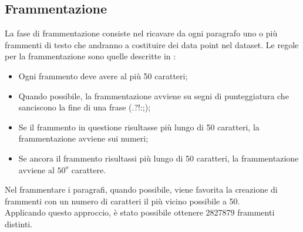 \documentclass[12pt]{article}
\begin{document}
\subsection{Frammentazione} \label{sec:spezzettamento}
La fase di frammentazione consiste nel ricavare da ogni paragrafo uno o più frammenti di testo che andranno a costituire dei data point nel dataset. Le regole per la frammentazione sono quelle descritte in  \cite{nematus}:
\begin{itemize}
\item Ogni frammento deve avere al più 50 caratteri;
\item Quando possibile, la frammentazione avviene su segni di punteggiatura che sanciscono la fine di una frase (.?!:;);
\item Se il frammento in questione risultasse più lungo di 50 caratteri, la frammentazione avviene sui numeri;
\item Se ancora il frammento risultassi più lungo di 50 caratteri, la frammentazione avviene al $50^o$ carattere.
\end{itemize}
Nel frammentare i paragrafi, quando possibile, viene favorita la creazione di frammenti con un numero di caratteri il più vicino possibile a 50.\\
Applicando questo approccio, è stato possibile ottenere 2827879 frammenti distinti.
\end{document}
